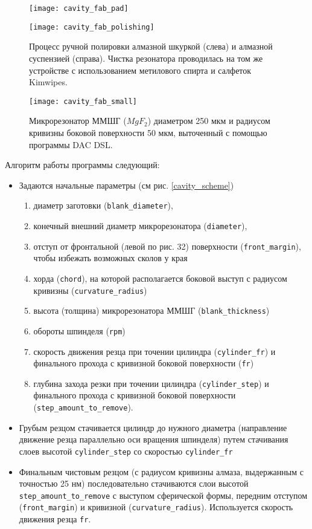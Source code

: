 \begin{figure}[ht]
  \begin{minipage}[ht]{0.49\linewidth}\centering
    \texttt{[image: cavity\_fab\_pad]}
  \end{minipage}
  \hfill
  \begin{minipage}[ht]{0.49\linewidth}\centering
    \texttt{[image: cavity\_fab\_polishing]}
  \end{minipage}
  \caption{Процесс ручной полировки алмазной шкуркой (слева) и алмазной суспензией (справа). Чистка резонатора проводилась на том же устройстве с использованием метилового спирта и салфеток Kimwipes.}
  \label{cavity_fab}
\end{figure}

\begin{figure}[ht]
\centering
  \texttt{[image: cavity\_fab\_small]}
  \caption{Микрорезонатор ММШГ ($MgF_2$) диаметром 250 мкм и радиусом кривизны боковой поверхности 50 мкм, выточенный с помощью программы DAC DSL.}
  \label{cavity_small}
\end{figure}

Алгоритм работы программы следующий:
\begin{itemize}
  \item Задаются начальные параметры (см рис. \ref{cavity_scheme})
  \begin{enumerate}
    \item диаметр заготовки (\texttt{blank\_diameter}),
    \item конечный внешний диаметр микрорезонатора (\texttt{diameter}),
    \item отступ от фронтальной (левой по рис. 32) поверхности (\texttt{front\_margin}), чтобы избежать возможных сколов у края
    \item хорда (\texttt{chord}), на которой располагается боковой выступ с радиусом кривизны (\texttt{curvature\_radius})
    \item высота (толщина) микрорезонатора ММШГ (\texttt{blank\_thickness})
    \item обороты шпинделя (\texttt{rpm})
    \item скорость движения резца при точении цилиндра (\texttt{cylinder\_fr}) и финального прохода с кривизной боковой поверхности (\texttt{fr})
    \item глубина захода резки при точении цилиндра (\texttt{cylinder\_step}) и финального прохода с кривизной боковой поверхности (\texttt{step\_amount\_to\_remove}).
  \end{enumerate}
  \item Грубым резцом стачивается цилиндр до нужного диаметра (направление движение резца параллельно оси вращения шпинделя) путем стачивания слоев высотой \texttt{cylinder\_step} со скоростью \texttt{cylinder\_fr}
  \item Финальным чистовым резцом (с радиусом кривизны алмаза, выдержанным с точностью 25 нм) последовательно стачиваются слои высотой \texttt{step\_amount\_to\_remove} с выступом сферической формы, передним отступом (\texttt{front\_margin}) и кривизной (\texttt{curvature\_radius}). Используется скорость движения резца \texttt{fr}.
\end{itemize}

